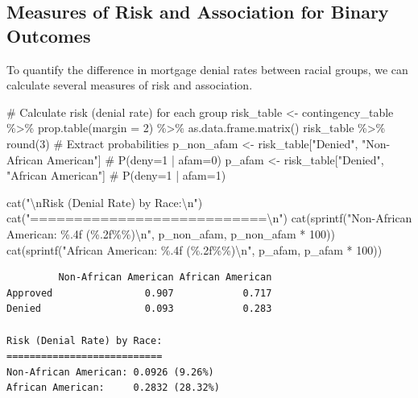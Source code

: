 \documentclass[
  12pt,
  letterpaper,
]{scrbook}
\newenvironment{Shaded}{\begin{snugshade}}{\end{snugshade}}
\newcommand{\AttributeTok}[1]{\textcolor[rgb]{0.40,0.45,0.13}{#1}}
\newcommand{\CommentTok}[1]{\textcolor[rgb]{0.37,0.37,0.37}{#1}}
\newcommand{\DecValTok}[1]{\textcolor[rgb]{0.68,0.00,0.00}{#1}}
\newcommand{\FunctionTok}[1]{\textcolor[rgb]{0.28,0.35,0.67}{#1}}
\newcommand{\NormalTok}[1]{\textcolor[rgb]{0.00,0.23,0.31}{#1}}
\newcommand{\OtherTok}[1]{\textcolor[rgb]{0.00,0.23,0.31}{#1}}
\newcommand{\SpecialCharTok}[1]{\textcolor[rgb]{0.37,0.37,0.37}{#1}}
\newcommand{\StringTok}[1]{\textcolor[rgb]{0.13,0.47,0.30}{#1}}
\theoremstyle{plain}
\theoremstyle{definition}
\theoremstyle{remark}
\begin{document}
\subsection{Measures of Risk and Association for Binary
Outcomes}\label{measures-of-risk-and-association-for-binary-outcomes}

To quantify the difference in mortgage denial rates between racial
groups, we can calculate several measures of risk and association.

\begin{Shaded}
\begin{Highlighting}[]
\CommentTok{\# Calculate risk (denial rate) for each group}
\NormalTok{risk\_table }\OtherTok{\textless{}{-}}\NormalTok{ contingency\_table }\SpecialCharTok{\%\textgreater{}\%}
    \FunctionTok{prop.table}\NormalTok{(}\AttributeTok{margin =} \DecValTok{2}\NormalTok{) }\SpecialCharTok{\%\textgreater{}\%}
    \FunctionTok{as.data.frame.matrix}\NormalTok{()}
\NormalTok{risk\_table }\SpecialCharTok{\%\textgreater{}\%} \FunctionTok{round}\NormalTok{(}\DecValTok{3}\NormalTok{)}
\CommentTok{\# Extract probabilities}
\NormalTok{p\_non\_afam }\OtherTok{\textless{}{-}}\NormalTok{ risk\_table[}\StringTok{"Denied"}\NormalTok{, }\StringTok{"Non{-}African American"}\NormalTok{] }\CommentTok{\# P(deny=1 | afam=0)}
\NormalTok{p\_afam }\OtherTok{\textless{}{-}}\NormalTok{ risk\_table[}\StringTok{"Denied"}\NormalTok{, }\StringTok{"African American"}\NormalTok{] }\CommentTok{\# P(deny=1 | afam=1)}

\FunctionTok{cat}\NormalTok{(}\StringTok{"}\SpecialCharTok{\textbackslash{}n}\StringTok{Risk (Denial Rate) by Race:}\SpecialCharTok{\textbackslash{}n}\StringTok{"}\NormalTok{)}
\FunctionTok{cat}\NormalTok{(}\StringTok{"===========================}\SpecialCharTok{\textbackslash{}n}\StringTok{"}\NormalTok{)}
\FunctionTok{cat}\NormalTok{(}\FunctionTok{sprintf}\NormalTok{(}\StringTok{"Non{-}African American: \%.4f (\%.2f\%\%)}\SpecialCharTok{\textbackslash{}n}\StringTok{"}\NormalTok{, p\_non\_afam, p\_non\_afam }\SpecialCharTok{*} \DecValTok{100}\NormalTok{))}
\FunctionTok{cat}\NormalTok{(}\FunctionTok{sprintf}\NormalTok{(}\StringTok{"African American:     \%.4f (\%.2f\%\%)}\SpecialCharTok{\textbackslash{}n}\StringTok{"}\NormalTok{, p\_afam, p\_afam }\SpecialCharTok{*} \DecValTok{100}\NormalTok{))}
\end{Highlighting}
\end{Shaded}

\begin{verbatim}
         Non-African American African American
Approved                0.907            0.717
Denied                  0.093            0.283

Risk (Denial Rate) by Race:
===========================
Non-African American: 0.0926 (9.26%)
African American:     0.2832 (28.32%)
\end{verbatim}
\end{document}
